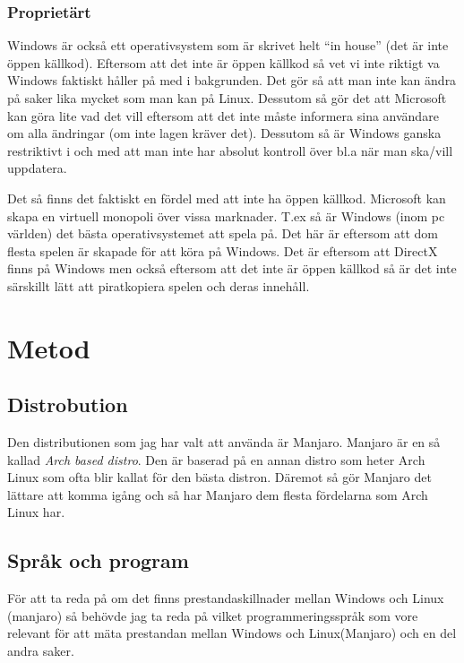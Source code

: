 \documentclass[12pt, a4paper]{report}
\begin{document}
    \subsubsection{Proprietärt}
    Windows är också ett operativsystem som är skrivet helt ``in house'' (det är inte öppen källkod).
    Eftersom att det inte är öppen källkod så vet vi inte riktigt va Windows faktiskt håller på med i bakgrunden. Det gör så att man inte kan ändra på saker lika mycket som man kan på Linux. Dessutom så gör det att Microsoft kan göra lite vad det vill eftersom att det inte måste informera sina användare om alla ändringar (om inte lagen kräver det). Dessutom så är Windows ganska restriktivt i och med att man inte har absolut kontroll över bl.a när man ska/vill uppdatera.


   Det så finns det faktiskt en fördel med att inte ha öppen källkod. Microsoft kan skapa en virtuell monopoli över vissa marknader. T.ex så är Windows (inom pc världen) det bästa operativsystemet att spela på. Det här är eftersom att dom flesta spelen är skapade för att köra på Windows. Det är eftersom att DirectX\cite{directx} finns på Windows men också eftersom att det inte är öppen källkod så är det inte särskillt lätt att piratkopiera spelen och deras innehåll.


 
\section{Metod}
 
\subsection{Distrobution}
Den distributionen som jag har valt att använda är Manjaro\cite{manjaro}. Manjaro är en så kallad \textit{Arch based distro}. Den är baserad på en annan distro som heter Arch Linux som ofta blir kallat för den bästa distron. Däremot så gör Manjaro det lättare att komma igång och så har Manjaro dem flesta fördelarna som Arch Linux har.

\subsection{Språk och program}
 
För att ta reda på om det finns prestandaskillnader mellan Windows och Linux (manjaro) så behövde jag ta reda på vilket programmeringsspråk som vore relevant för att mäta prestandan mellan Windows och Linux(Manjaro) och en del andra saker.
\end{document}
